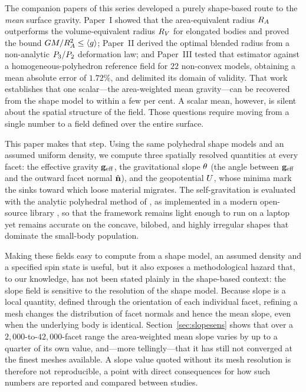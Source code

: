 The companion papers of this series developed a purely shape-based route to the
\emph{mean} surface gravity. Paper~I \citep{paper1} showed that the
area-equivalent radius $R_{A}$ outperforms the volume-equivalent radius $R_{V}$ for
elongated bodies and proved the bound $GM/R_{A}^{2}\leq\langle g\rangle$; Paper~II
\citep{paper2} derived the optimal blended radius from a non-analytic
$P_{3}/P_{2}$ deformation law; and Paper~III \citep{paper3} tested that
estimator against a homogeneous-polyhedron reference field for $22$ non-convex
models, obtaining a mean absolute error of $1.72\%$, and delimited its domain of
validity. That work establishes that one scalar---the area-weighted mean
gravity---can be recovered from the shape model to within a few per cent. A
scalar
mean, however, is silent about the spatial structure of the field. Those
questions require moving from a single number to a field defined over the
entire surface.

This paper makes that step. Using the same polyhedral shape models and an
assumed uniform density, we compute three spatially resolved quantities at
every facet: the effective gravity $\mathbf{g}_{\mathrm{eff}}$, the gravitational slope $\theta$
(the angle between $\mathbf{g}_{\mathrm{eff}}$ and the outward facet normal $\hat{\mathbf{n}}$), and the
geopotential $U$, whose minima mark the sinks toward which loose material
migrates. The self-gravitation is evaluated with the analytic polyhedral method
of \citet{werner1996}, as implemented in a modern open-source library
\citep{tsoulis2012,gravitylib}, so that the framework remains light enough to
run on a laptop yet remains accurate on the concave, bilobed, and highly
irregular shapes that dominate the small-body population.

Making these fields easy to compute from a shape model, an assumed density and
a specified spin state is useful, but it also
exposes a methodological hazard that, to our knowledge, has not been stated
plainly in the shape-based context: the slope field is sensitive to the
resolution of the shape model. Because slope is a local quantity, defined
through the orientation of each individual facet, refining a mesh changes the
distribution of facet normals and hence the mean slope, even when the underlying
body is identical. Section~\ref{sec:slopesens} shows that over a
$2{,}000$-to-$42{,}000$-facet range the area-weighted mean slope varies by up to
a quarter of its own value, and---more tellingly---that it has still not
converged at the finest meshes available. A slope value quoted without its mesh
resolution is therefore not reproducible, a point with direct consequences for
how such numbers are reported and compared between studies.

